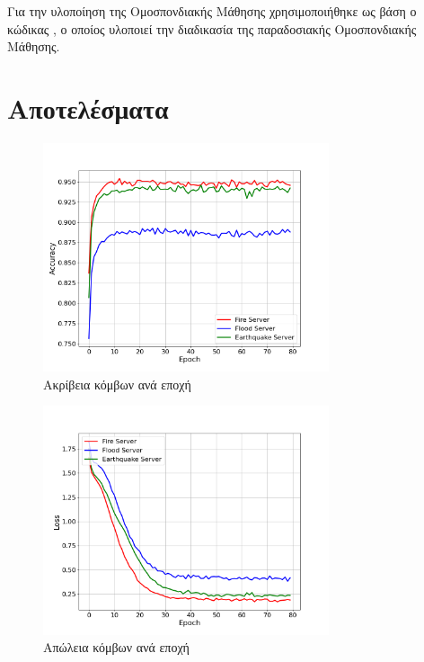 Για την υλοποίηση της Ομοσπονδιακής Μάθησης χρησιμοποιήθηκε ως βάση ο κώδικας , ο οποίος υλοποιεί την διαδικασία της παραδοσιακής Ομοσπονδιακής Μάθησης.

\section{Αποτελέσματα}

\begin{figure}[H]
    \centering
    \includegraphics[width=0.75\textwidth]{figures/chapter2/User_Accuracies.png}
    \caption{Ακρίβεια κόμβων ανά εποχή}
    \label{fig1}
\end{figure}

\begin{figure}[H]
    \centering
    \includegraphics[width=0.75\textwidth]{figures/chapter2/User_Losses.png}
    \caption{Απώλεια κόμβων ανά εποχή}
    \label{fig2}
\end{figure}

\newpage

